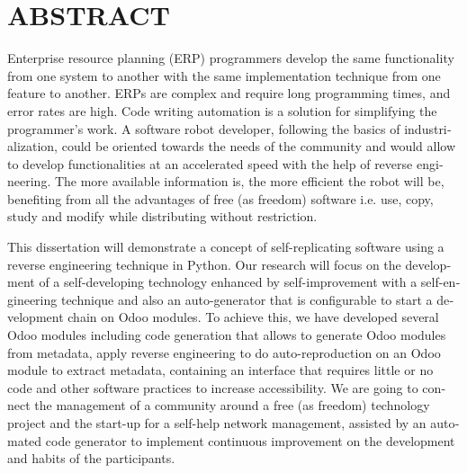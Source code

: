 


\chapter*{ABSTRACT}\thispagestyle{headings}
%
\begin{otherlanguage}{english}
Enterprise resource planning (ERP) programmers develop the same functionality from one system to another with the same implementation technique from one feature to another. ERPs are complex and require long programming times, and error rates are high. Code writing automation is a solution for simplifying the programmer's work. A software robot developer, following the basics of industrialization, could be oriented towards the needs of the community and would allow to develop functionalities at an accelerated speed with the help of reverse engineering. The more available information is, the more efficient the robot will be, benefiting from all the advantages of free (as freedom) software i.e. use, copy, study and modify while distributing without restriction.

This dissertation will demonstrate a concept of self-replicating software using a reverse engineering technique in Python. Our research will focus on the development of a self-developing technology enhanced by self-improvement with a self-engineering technique and also an auto-generator that is configurable to start a development chain on Odoo modules. To achieve this, we have developed several Odoo modules including code generation that allows to generate Odoo modules from metadata, apply reverse engineering to do auto-reproduction on an Odoo module to extract metadata, containing an interface that requires little or no code and other software practices to increase accessibility. We are going to connect the management of a community around a free (as freedom) technology project and the start-up for a self-help network management, assisted by an automated code generator to implement continuous improvement on the development and habits of the participants.



\end{otherlanguage}
